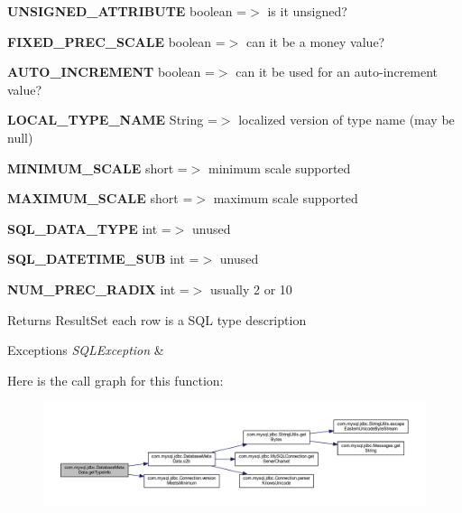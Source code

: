 \begin{DoxyEnumerate}
\begin{DoxyItemize}
\end{DoxyItemize}
\item {\bfseries U\+N\+S\+I\+G\+N\+E\+D\+\_\+\+A\+T\+T\+R\+I\+B\+U\+TE} boolean =$>$ is it unsigned? 
\item {\bfseries F\+I\+X\+E\+D\+\_\+\+P\+R\+E\+C\+\_\+\+S\+C\+A\+LE} boolean =$>$ can it be a money value? 
\item {\bfseries A\+U\+T\+O\+\_\+\+I\+N\+C\+R\+E\+M\+E\+NT} boolean =$>$ can it be used for an auto-\/increment value? 
\item {\bfseries L\+O\+C\+A\+L\+\_\+\+T\+Y\+P\+E\+\_\+\+N\+A\+ME} String =$>$ localized version of type name (may be null) 
\item {\bfseries M\+I\+N\+I\+M\+U\+M\+\_\+\+S\+C\+A\+LE} short =$>$ minimum scale supported 
\item {\bfseries M\+A\+X\+I\+M\+U\+M\+\_\+\+S\+C\+A\+LE} short =$>$ maximum scale supported 
\item {\bfseries S\+Q\+L\+\_\+\+D\+A\+T\+A\+\_\+\+T\+Y\+PE} int =$>$ unused 
\item {\bfseries S\+Q\+L\+\_\+\+D\+A\+T\+E\+T\+I\+M\+E\+\_\+\+S\+UB} int =$>$ unused 
\item {\bfseries N\+U\+M\+\_\+\+P\+R\+E\+C\+\_\+\+R\+A\+D\+IX} int =$>$ usually 2 or 10 
\end{DoxyEnumerate}

\begin{DoxyReturn}{Returns}
Result\+Set each row is a S\+QL type description 
\end{DoxyReturn}

\begin{DoxyExceptions}{Exceptions}
{\em S\+Q\+L\+Exception} & \\
\hline
\end{DoxyExceptions}
Here is the call graph for this function\+:
\nopagebreak
\begin{figure}[H]
\begin{center}
\leavevmode
\includegraphics[width=350pt]{classcom_1_1mysql_1_1jdbc_1_1_database_meta_data_a0a7b3d02517a744b77c3085eaccd871d_cgraph}
\end{center}
\end{figure}
\mbox{\label{classcom_1_1mysql_1_1jdbc_1_1_database_meta_data_a04674d2bac91f5363de9af66e6afb095}} 
